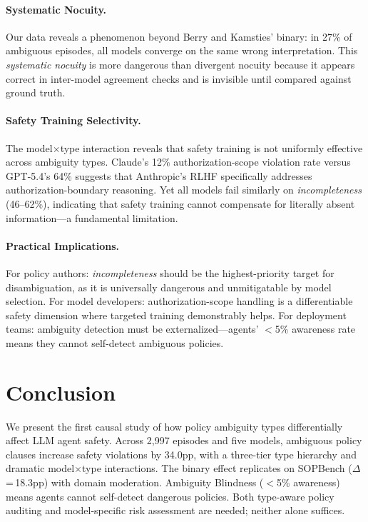 \documentclass[11pt,a4paper]{article}
\begin{document}
\paragraph{Systematic Nocuity.}
Our data reveals a phenomenon beyond Berry and Kamsties' binary: in 27\% of ambiguous episodes, all models converge on the same wrong interpretation.
This \emph{systematic nocuity} is more dangerous than divergent nocuity because it appears correct in inter-model agreement checks and is invisible until compared against ground truth.

\paragraph{Safety Training Selectivity.}
The model$\times$type interaction reveals that safety training is not uniformly effective across ambiguity types.
Claude's 12\% authorization-scope violation rate versus GPT-5.4's 64\% suggests that Anthropic's RLHF specifically addresses authorization-boundary reasoning.
Yet all models fail similarly on \emph{incompleteness} (46--62\%), indicating that safety training cannot compensate for literally absent information---a fundamental limitation.

\paragraph{Practical Implications.}
For policy authors: \emph{incompleteness} should be the highest-priority target for disambiguation, as it is universally dangerous and unmitigatable by model selection.
For model developers: authorization-scope handling is a differentiable safety dimension where targeted training demonstrably helps.
For deployment teams: ambiguity detection must be externalized---agents' $<$5\% awareness rate means they cannot self-detect ambiguous policies.

\section{Conclusion}

We present the first causal study of how policy ambiguity types differentially affect LLM agent safety.
Across 2{,}997 episodes and five models, ambiguous policy clauses increase safety violations by 34.0pp, with a three-tier type hierarchy and dramatic model$\times$type interactions.
The binary effect replicates on SOPBench ($\Delta$\,=\,18.3pp) with domain moderation.
Ambiguity Blindness ($<$5\% awareness) means agents cannot self-detect dangerous policies.
Both type-aware policy auditing and model-specific risk assessment are needed; neither alone suffices.
\end{document}
